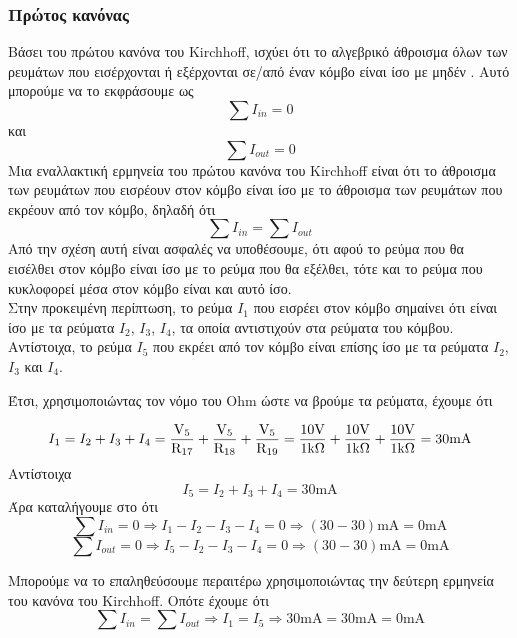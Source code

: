 \documentclass{article}
\begin{document}
\subsubsection{Πρώτος κανόνας}
Βάσει του πρώτου κανόνα του Kirchhoff, ισχύει ότι το αλγεβρικό άθροισμα όλων
των ρευμάτων που εισέρχονται ή εξέρχονται σε/από έναν κόμβο είναι ίσο με
μηδέν \cite{papadopoulos}. Αυτό μπορούμε να το εκφράσουμε ως 
\[\sum{I_{in}} = 0\] και \[\sum{I_{out}} = 0\]
Μια εναλλακτική ερμηνεία του πρώτου κανόνα του Kirchhoff είναι ότι το άθροισμα των
ρευμάτων που εισρέουν στον κόμβο είναι ίσο με το άθροισμα των ρευμάτων που εκρέουν
από τον κόμβο, δηλαδή ότι
\[\sum{I_{in}} = \sum{I_{out}}\]
Από την σχέση αυτή είναι ασφαλές να υποθέσουμε, ότι αφού το ρεύμα που θα εισέλθει στον
κόμβο είναι ίσο με το ρεύμα που θα εξέλθει, τότε και το ρεύμα που κυκλοφορεί μέσα στον
κόμβο είναι και αυτό ίσο. \\
Στην προκειμένη περίπτωση, το ρεύμα $I_1$ που εισρέει στον κόμβο σημαίνει ότι είναι
ίσο με τα ρεύματα $I_2$, $I_3$, $I_4$, τα οποία αντιστιχούν στα ρεύματα του κόμβου.
Αντίστοιχα, το ρεύμα $I_5$ που εκρέει από τον κόμβο είναι επίσης ίσο με τα ρεύματα
$I_2$, $I_3$ και $I_4$.

Έτσι, χρησιμοποιώντας τον νόμο του Ohm ώστε να βρούμε τα ρεύματα, έχουμε ότι

\[I_1 = I_2 + I_3 + I_4 = \si{\frac{V_5}{R_{17}} + \frac{V_5}{R_{18}} +
	\frac{V_5}{R_{19}}} = \si{\frac{10\volt}{1\kohm} +
	\frac{10\volt}{1\kohm} + \frac{10\volt}{1\kohm}} =
	\si{30\milli\ampere}\]
Αντίστοιχα
\[I_5 = I_2 + I_3 + I_4 = \si{30\milli\ampere}\]
Άρα καταλήγουμε στο ότι
\[\sum{I_{in}} = 0 \Rightarrow I_1 - I_2 - I_3 - I_4 = 0 \Rightarrow
    \si{(30 - 30)\milli\ampere} = \si{0\milli\ampere}\]
\[\sum{I_{out}} = 0 \Rightarrow I_5 - I_2 - I_3 - I_4 = 0 \Rightarrow
    \si{(30 - 30)\milli\ampere} = \si{0\milli\ampere}\]

Μπορούμε να το επαληθεύσουμε περαιτέρω χρησιμοποιώντας την δεύτερη ερμηνεία του
κανόνα του Kirchhoff. Οπότε έχουμε ότι
\[\sum{I_{in}} = \sum{I_{out}} \Rightarrow I_1 = I_5 \Rightarrow \si{30\milli\ampere} =
        \si{30\milli\ampere} = \si{0\milli\ampere}\]
\end{document}
